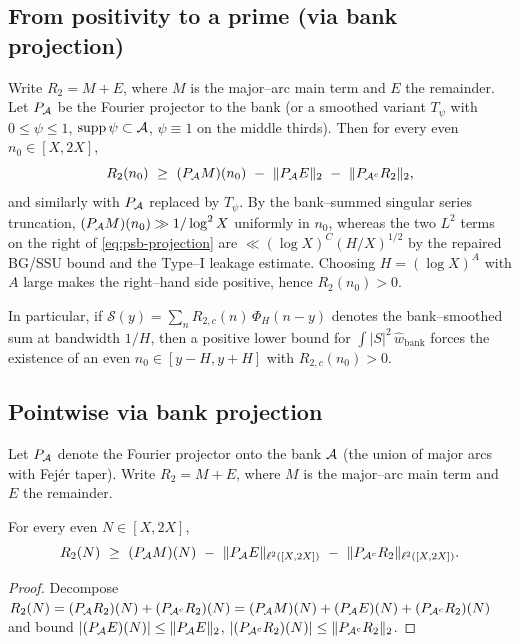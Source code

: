 \subsection{From positivity to a prime (via bank projection)}\label{subsec:psb.endgame}

Write $R_2 = M + E$, where $M$ is the major–arc main term and $E$ the remainder.
Let $P_{\mathcal{A}}$ be the Fourier projector to the bank (or a smoothed variant $T_\psi$ with $0\le \psi\le 1$, $\operatorname{supp}\psi\subset\mathcal{A}$, $\psi\equiv 1$ on the middle thirds). Then for every even $n_0\in[X,2X]$,
\begin{equation}\label{eq:psb-projection}
R_2(n_0)\ \ge\ (\PA M)(n_0)\ -\ \|\PA E\|_2\ -\ \|P_{\cA^c}R_2\|_2,
\end{equation}
and similarly with $P_{\mathcal{A}}$ replaced by $T_\psi$.
By the bank–summed singular series truncation, $(P_{\mathcal{A}} M)(n_0)\gg 1/\log^2 X$ uniformly in $n_0$, whereas the two
$L^2$ terms on the right of \eqref{eq:psb-projection} are $\ll (\log X)^C (H/X)^{1/2}$ by the repaired BG/SSU bound and the Type–I
leakage estimate. Choosing $H=(\log X)^A$ with $A$ large makes the right–hand side positive, hence $R_2(n_0)>0$.
\medskip

In particular, if $\mathcal S(y)=\sum_n R_{2,c}(n)\,\Phi_H(n-y)$ denotes the bank–smoothed sum at bandwidth $1/H$, then a positive lower bound for $\int |S|^2\,\widehat w_{\mathrm{bank}}$ forces the existence of an even $n_0\in[y-H,y+H]$ with $R_{2,c}(n_0)>0$.


\subsection{Pointwise via bank projection}\label{subsec:pointwise-projection}

Let $P_{\mathcal{A}}$ denote the Fourier projector onto the bank $\mathcal{A}$ (the union of major arcs with Fejér taper). 
Write $R_2 = M + E$, where $M$ is the major–arc main term and $E$ the remainder.

\begin{lemma}\label{lem:bank-projection}
For every even $N\in[X,2X]$,
\[
R_2(N)\ \ge\ (P_{\mathcal{A}} M)(N)\ -\ \|P_{\mathcal{A}} E\|_{\ell^2([X,2X])}\ -\ \|P_{\mathcal{A}^c}R_2\|_{\ell^2([X,2X])}.
\]
\end{lemma}

\begin{proof}
Decompose $R_2(N)=(P_{\mathcal{A}} R_2)(N) + (P_{\mathcal{A}^c}R_2)(N) = (P_{\mathcal{A}} M)(N) + (P_{\mathcal{A}} E)(N) + (P_{\mathcal{A}^c}R_2)(N)$ and bound
$|(P_{\mathcal{A}} E)(N)|\le \|P_{\mathcal{A}} E\|_2$, $|(P_{\mathcal{A}^c}R_2)(N)|\le \|P_{\mathcal{A}^c}R_2\|_2$.
\end{proof}

